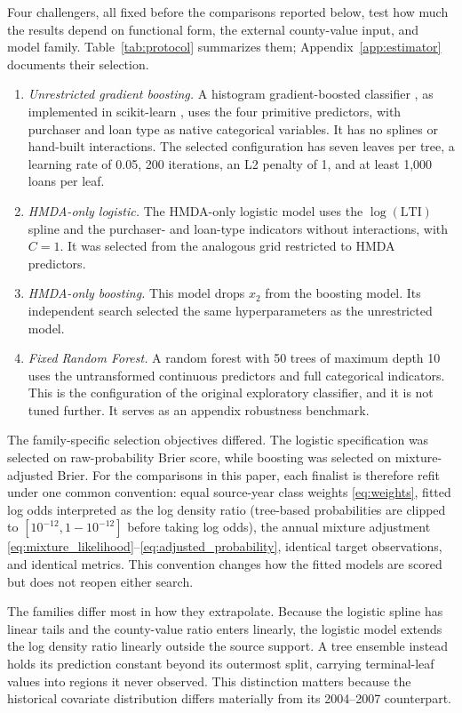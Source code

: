 \documentclass[letterpaper,12pt,usenames,dvipsnames]{article}
\theoremstyle{definition}
\begin{document}
Four challengers, all fixed before the comparisons reported below, test how much the results
depend on functional form, the external county-value input, and model family.
Table~\ref{tab:protocol} summarizes them; Appendix~\ref{app:estimator} documents their
selection.
\begin{enumerate}
	\item \emph{Unrestricted gradient boosting.} A histogram gradient-boosted classifier
	\citep{friedman2001greedy,ke2017lightgbm}, as implemented in scikit-learn
	\citep{pedregosa2011scikit}, uses the four primitive predictors, with purchaser and loan
	type as native categorical variables. It has no splines or hand-built interactions. The
	selected configuration has seven leaves per tree, a learning rate of 0.05, 200 iterations,
	an L2 penalty of 1, and at least 1,000 loans per leaf.
	\item \emph{HMDA-only logistic.} The HMDA-only logistic model uses the $\log(\text{LTI})$
	spline and the purchaser- and loan-type indicators without interactions, with $C = 1$. It
	was selected from the analogous grid restricted to HMDA predictors.
	\item \emph{HMDA-only boosting.} This model drops $x_2$ from the boosting model. Its
	independent search selected the same hyperparameters as the unrestricted model.
	\item \emph{Fixed Random Forest.} A random forest \citep{breiman2001random} with 50 trees of
	maximum depth 10 uses the untransformed continuous predictors and full categorical
	indicators. This is the configuration of the original exploratory classifier, and it is not
	tuned further. It serves as an appendix robustness benchmark.
\end{enumerate}

The family-specific selection objectives differed. The logistic specification was selected on
raw-probability Brier score, while boosting was selected on mixture-adjusted Brier. For the
comparisons in this paper, each finalist is therefore refit under one common convention: equal
source-year class weights \eqref{eq:weights}, fitted log odds interpreted as the log density
ratio (tree-based probabilities are clipped to $[10^{-12}, 1 - 10^{-12}]$ before taking log
odds), the annual mixture adjustment \eqref{eq:mixture_likelihood}--\eqref{eq:adjusted_probability},
identical target observations, and identical metrics. This convention changes how the fitted
models are scored but does not reopen either search.

The families differ most in how they extrapolate. Because the logistic spline has linear tails
and the county-value ratio enters linearly, the logistic model extends the log density ratio
linearly outside the source support. A tree ensemble instead holds its prediction constant
beyond its outermost split, carrying terminal-leaf values into regions it never observed. This
distinction matters because the historical covariate distribution differs materially from its
2004--2007 counterpart.
\end{document}
